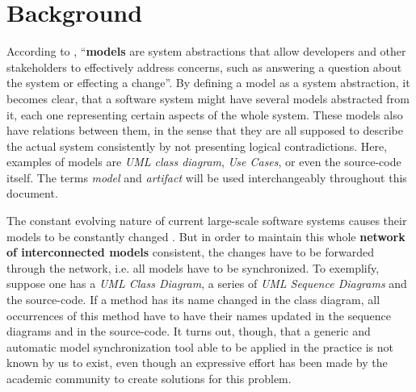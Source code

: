 \documentclass[tuberlin,cic,tc,english,noabntcite,oneside]{iiufrgs}
\begin{document}
\section{Background}
According to \citet[p. 21]{czarnecki2006feature}, \enquote{\textbf{models} are system abstractions that allow developers and other stakeholders to effectively address concerns, such as answering a question about the system or effecting a change}. By defining a model as a system abstraction, it becomes clear, that a software system might have several models abstracted from it, each one representing certain aspects of the whole system. These models also have relations between them, in the sense that they are all supposed to describe the actual system consistently by not presenting logical contradictions. Here, examples of models are \emph{UML class diagram}, \emph{Use Cases}, or even the source-code itself. The terms \emph{model} and \emph{artifact} will be used interchangeably throughout this document.

The constant evolving nature of current large-scale software systems causes their models to be constantly changed \citep{diskin2011model}. But in order to maintain this whole \textbf{network of interconnected models} consistent, the changes have to be forwarded through the network, i.e. all models have to be synchronized. To exemplify, suppose one has a \emph{UML Class Diagram}, a series of \emph{UML Sequence Diagrams} and the source-code. If a method has its name changed in the class diagram, all occurrences of this method have to have their names updated in the sequence diagrams and in the source-code. It turns out, though, that a generic and automatic model synchronization tool able to be applied in the practice is not known by us to exist, even though an expressive effort has been made by the academic community to create solutions for this problem.

\end{document}
